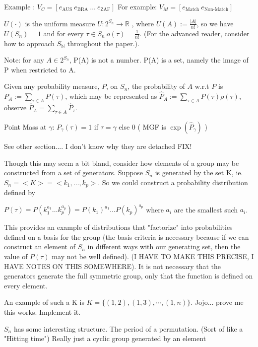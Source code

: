 \documentclass{article}
\theoremstyle{definition}
\begin{document}
Example : $V_{C} = [ e_{\text{AUS}} \: e_{\text{BRA}} \: \dots \: e_{\text{ZAF}} ]$
For example: $V_{M} = [ e_{\text{Match}} \: e_{\text{Non-Match}} ]$

$U(\cdot)$ is the uniform measure $ U: 2^{S_n} \rightarrow \mathbb{R} $ , where $ U(A) := \frac{ |A| }{n!}$, so we have $U(S_n) = 1$ and for every $\tau \in S_n \: o(\tau) = \frac{1}{n!}$. (For the advanced reader, consider how to approach $ S_\mathbb{N}$ throughout the paper.).


Note: for any $A \in 2^{S_n} $, P(A) is not a number. P(A) is a set, namely the image of P when restricted to A. 

Given any probability measure, $P$, on $S_n$, the probability of $A$ w.r.t $P$ is $ P_A  := \sum_{\tau \in A} P(\tau) $, which may be represented as $\hat{P}_A := \sum_{\tau \in A} P(\tau) \rho(\tau) $, observe $\hat{P}_A = \sum_{\tau \in A} \hat{P}_\tau $. 

Point Mass at $\gamma$: $ P_\gamma(\tau) = 1 $ if $\tau = \gamma$ else 0
( MGF is $\exp(\hat{P}_\gamma)$ )

See other section.... I don't know why they are detached FIX!

Though this may seem a bit bland, consider how elements of a group may be constructed from a set of generators. Suppose $S_n$ is generated by the set K, ie. $S_n = < K > = <k_1, \dots, k_p >$. So we could construct a probability distribution defined by

\( P(\tau) = P( k_1^{a_1} \dots k_p^{a_p}) = P( k_1)^{a_1}\dots P(k_p )^{a_p} \) where $a_i$ are the smallest such $a_i$.

This provides an example of distributions that "factorize" into probabilities defined on a basis for the group (the basis criteria is necessary because if we can construct an element of $S_n$ in different ways with our generating set, then the value of $P(\tau)$ may not be well defined). (I HAVE TO MAKE THIS PRECISE, I HAVE NOTES ON THIS SOMEWHERE). It is not necessary that the generators generate the full symmetric group, only that the function is defined on every element.

An example of such a K is $K= \{(1,2), (1,3), \cdots, (1,n) \}$. Jojo... prove me this works. Implement it.

$S_n$ has some interesting structure.
The period of a permutation. (Sort of like a "Hitting time")
Really just a cyclic group generated by an element
\end{document}
